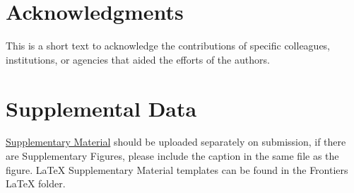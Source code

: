 \documentclass[utf8]{frontiersSCNS} %
\begin{document}





\section*{Acknowledgments}
This is a short text to acknowledge the contributions of specific colleagues, institutions, or agencies that aided the efforts of the authors.

\section*{Supplemental Data}
 \href{http://home.frontiersin.org/about/author-guidelines#SupplementaryMaterial}{Supplementary Material} should be uploaded separately on submission, if there are Supplementary Figures, please include the caption in the same file as the figure. LaTeX Supplementary Material templates can be found in the Frontiers LaTeX folder.
\end{document}
